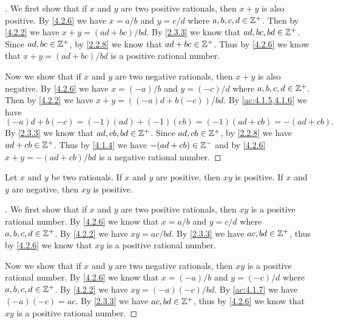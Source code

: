\begin{proof}[]
  We first show that if \(x\) and \(y\) are two positive rationals, then \(x + y\) is also positive.
  By \cref{4.2.6} we have \(x = a / b\) and \(y = c / d\) where \(a, b, c, d \in \mathbb{Z}^+\).
  Then by \cref{4.2.2} we have \(x + y = (ad + bc) / bd\).
  By \cref{2.3.3} we know that \(ad, bc, bd \in \mathbb{Z}^+\).
  Since \(ad, bc \in \mathbb{Z}^+\), by \cref{2.2.8} we know that \(ad + bc \in \mathbb{Z}^+\).
  Thus by \cref{4.2.6} we know that \(x + y = (ad + bc) / bd\) is a positive rational number.

  Now we show that if \(x\) and \(y\) are two negative rationals, then \(x + y\) is also negative.
  By \cref{4.2.6} we have \(x = (-a) / b\) and \(y = (-c) / d\) where \(a, b, c, d \in \mathbb{Z}^+\).
  Then by \cref{4.2.2} we have \(x + y = ((-a)d + b(-c)) / bd\).
  By \cref{ac:4.1.5,4.1.6} we have
  \[
    (-a)d + b(-c) = (-1) (ad) + (-1) (cb) = (-1)(ad + cb) = -(ad + cb).
  \]
  By \cref{2.3.3} we know that \(ad, cb, bd \in \mathbb{Z}^+\).
  Since \(ad, cb \in \mathbb{Z}^+\), by \cref{2.2.8} we have \(ad + cb \in \mathbb{Z}^+\).
  Thus by \cref{4.1.4} we have \(-(ad + cb) \in \mathbb{Z}^-\) and by \cref{4.2.6} \(x + y = -(ad + cb) / bd\) is a negative rational number.
\end{proof}

\begin{ac}\label{ac:4.2.7}
  Let \(x\) and \(y\) be two rationals.
  If \(x\) and \(y\) are positive, then \(xy\) is positive.
  If \(x\) and \(y\) are negative, then \(xy\) is positive.
\end{ac}

\begin{proof}[]
  We first show that if \(x\) and \(y\) are two positive rationals, then \(xy\) is a positive rational number.
  By \cref{4.2.6} we know that \(x = a / b\) and \(y = c / d\) where \(a, b, c, d \in \mathbb{Z}^+\).
  By \cref{4.2.2} we have \(xy = ac / bd\).
  By \cref{2.3.3} we have \(ac, bd \in \mathbb{Z}^+\), thus by \cref{4.2.6} we know that \(xy\) is a positive rational number.

  Now we show that if \(x\) and \(y\) are two negative rationals, then \(xy\) is a positive rational number.
  By \cref{4.2.6} we know that \(x = (-a) / b\) and \(y = (-c) / d\) where \(a, b, c, d \in \mathbb{Z}^+\).
  By \cref{4.2.2} we have \(xy = (-a)(-c) / bd\).
  By \cref{ac:4.1.7} we have \((-a)(-c) = ac\).
  By \cref{2.3.3} we have \(ac, bd \in \mathbb{Z}^+\), thus by \cref{4.2.6} we know that \(xy\) is a positive rational number.
\end{proof}

